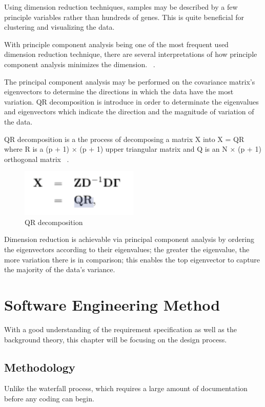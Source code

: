 \documentclass[]{final_report}
\begin{document}
Using dimension reduction techniques, samples may be described by a few principle variables rather than hundreds of genes. This is quite beneficial for clustering and visualizing the data.

With principle component analysis being one of the most frequent used dimension reduction technique, there are several interpretations of how principle component analysis minimizes the dimension. ~\cite{akalin2020computational}.

The principal component analysis may be performed on the covariance matrix's eigenvectors to determine the directions in which the data have the most variation.
QR decomposition is introduce in order to determinate the eigenvalues and eigenvectors which indicate the direction and the magnitude of variation of the data. 

QR decomposition is a the process of decomposing a matrix X into X = QR where R is a (p + 1) × (p + 1) upper triangular matrix and Q is an N × (p + 1) orthogonal matrix ~\cite{franklin2005elements}.

\begin{figure}[H]
    \centering
    \includegraphics[width=0.5\textwidth]{QR .png}
    \caption{QR decomposition}
    \label{fig:qr_decomposition}
\end{figure}

Dimension reduction is achievable via principal component analysis by ordering the eigenvectors according to their eigenvalues; the greater the eigenvalue, the more variation there is in comparison; this enables the top eigenvector to capture the majority of the data's variance.

\chapter{Software Engineering Method}
With a good understanding of the requirement specification as well as the background theory, this chapter will be focusing on the design process. 

\section{Methodology}
Unlike the waterfall process, which requires a large amount of documentation before any coding can begin.
\end{document}
